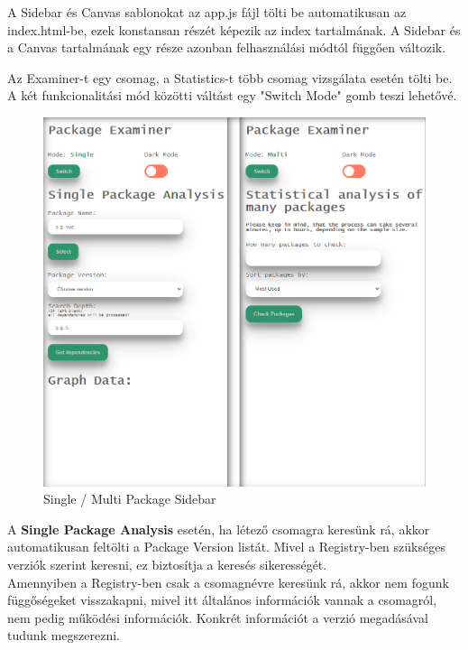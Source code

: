 A Sidebar és Canvas sablonokat az app.js fájl tölti be automatikusan az index.html-be, ezek konstansan részét képezik az index tartalmának. A Sidebar és a Canvas tartalmának egy része azonban felhasználási módtól függően változik.

Az Examiner-t egy csomag, a Statistics-t több csomag vizsgálata esetén tölti be. A két funkcionalitási mód közötti váltást egy "Switch Mode" gomb teszi lehetővé.\\

\begin{figure}[!h]
	\centering
	\includegraphics[scale=0.2]{images/ui_modes.png}
	\caption{Single / Multi Package Sidebar}
	\label{fig:ui_modes}
\end{figure}

\pagebreak


A \textbf{Single Package Analysis} esetén, ha létező csomagra keresünk rá, akkor automatikusan feltölti a Package Version listát. Mivel a Registry-ben szükséges verziók szerint keresni, ez biztosítja a keresés sikerességét.\\

Amennyiben a Registry-ben csak a csomagnévre keresünk rá, akkor nem fogunk függőségeket visszakapni, mivel itt általános információk vannak a csomagról, nem pedig működési információk. Konkrét információt a verzió megadásával tudunk megszerezni.\\

